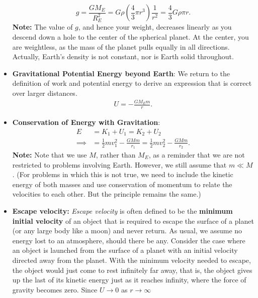 \documentclass{report}
\begin{document}
\begin{itemize}
            \[ g = \frac{G M_E}{R_E^2} = G \rho \left( \frac{4}{3} \pi r^3 \right) \frac{1}{r^2} = \frac{4}{3} G \rho \pi r. \]
            \bigbreak \noindent 
            \textbf{Note:} The value of $g$, and hence your weight, decreases linearly as you descend down a hole to the center of the spherical planet. At the center, you are weightless, as the mass of the planet pulls equally in all directions.
            \bigbreak \noindent 
            Actually, Earth’s density is not constant, nor is Earth solid throughout.
        \item \textbf{Gravitational Potential Energy beyond Earth}: We return to the definition of work and potential energy to derive an expression that is correct over larger distances.
            \begin{align*}
                U = - \frac{GM_{E}m}{r}
            .\end{align*}
        \item \textbf{Conservation of Energy with Gravitation}:
            \begin{align*}
                E &= K_{1} + U_{1} = K_{2} + U_{2}\\
                \implies &= \frac{1}{2}mv_{1}^{2} - \frac{GMm}{r_{1}} = \frac{1}{2}mv_{2}^{2} - \frac{GMm}{r_{2}}
            .\end{align*}
            \bigbreak \noindent 
            \textbf{Note:}
            Note that we use \(M\), rather than \(M_{E}\), as a reminder that we are not restricted to problems involving Earth. However, we still assume that \(m \ll M\). (For problems in which this is not true, we need to include the kinetic energy of both masses and use conservation of momentum to relate the velocities to each other. But the principle remains the same.)
        \item \textbf{Escape velocity:}
            \textit{Escape velocity} is often defined to be the \textbf{minimum initial velocity} of an object that is required to escape the surface of a planet (or any large body like a moon) and never return. As usual, we assume no energy lost to an atmosphere, should there be any.
            \bigbreak \noindent 
            Consider the case where an object is launched from the surface of a planet with an initial velocity directed away from the planet. With the minimum velocity needed to escape, the object would just come to rest infinitely far away, that is, the object gives up the last of its kinetic energy just as it reaches infinity, where the force of gravity becomes zero. Since $U \rightarrow 0 $ as $r \rightarrow \infty $

\end{itemize}
\end{document}
